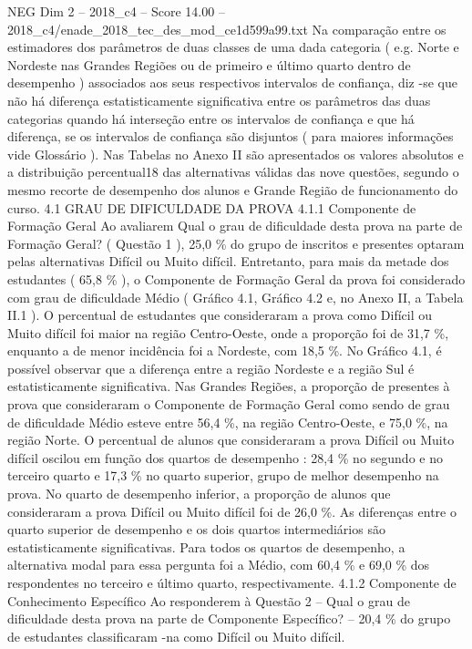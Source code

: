 \begin{textsample}{NEG Dim 2 – 2018\_c4 – Score 14.00 – 2018\_c4/enade\_2018\_tec\_des\_mod\_ce1d599a99.txt}
Na comparação entre os estimadores dos parâmetros de duas classes de uma dada categoria ( e.g.
Norte e Nordeste nas Grandes Regiões ou de primeiro e último quarto dentro de desempenho ) associados aos seus respectivos intervalos de confiança, diz -se que não há diferença estatisticamente significativa entre os parâmetros das duas categorias quando há interseção entre os intervalos de confiança e que há diferença, se os intervalos de confiança são disjuntos ( para maiores informações vide Glossário ).
Nas Tabelas no Anexo II são apresentados os valores absolutos e a distribuição percentual18 das alternativas válidas das nove questões, segundo o mesmo recorte de desempenho dos alunos e Grande Região de funcionamento do curso. 4.1 GRAU DE DIFICULDADE DA PROVA 4.1.1 Componente de Formação Geral Ao avaliarem Qual o grau de dificuldade desta prova na parte de Formação Geral? ( Questão 1 ), 25,0 \% do grupo de inscritos e presentes optaram pelas alternativas Difícil ou Muito difícil.
Entretanto, para mais da metade dos estudantes ( 65,8 \% ), o Componente de Formação Geral da prova foi considerado com grau de dificuldade Médio ( Gráfico 4.1, Gráfico 4.2 e, no Anexo II, a Tabela II.1 ).
O percentual de estudantes que consideraram a prova como Difícil ou Muito difícil foi maior na região Centro-Oeste, onde a proporção foi de 31,7 \%, enquanto a de menor incidência foi a Nordeste, com 18,5 \%.
No Gráfico 4.1, é possível observar que a diferença entre a região Nordeste e a região Sul é estatisticamente significativa.
Nas Grandes Regiões, a proporção de presentes à prova que consideraram o Componente de Formação Geral como sendo de grau de dificuldade Médio esteve entre 56,4 \%, na região Centro-Oeste, e 75,0 \%, na região Norte.
O percentual de alunos que consideraram a prova Difícil ou Muito difícil oscilou em função dos quartos de desempenho : 28,4 \% no segundo e no terceiro quarto e 17,3 \% no quarto superior, grupo de melhor desempenho na prova.
No quarto de desempenho inferior, a proporção de alunos que consideraram a prova Difícil ou Muito difícil foi de 26,0 \%.
As diferenças entre o quarto superior de desempenho e os dois quartos intermediários são estatisticamente significativas.
Para todos os quartos de desempenho, a alternativa modal para essa pergunta foi a Médio, com 60,4 \% e 69,0 \% dos respondentes no terceiro e último quarto, respectivamente. 4.1.2 Componente de Conhecimento Específico Ao responderem à Questão 2 – Qual o grau de dificuldade desta prova na parte de Componente Específico? – 20,4 \% do grupo de estudantes classificaram -na como Difícil ou Muito difícil.

\end{textsample}
